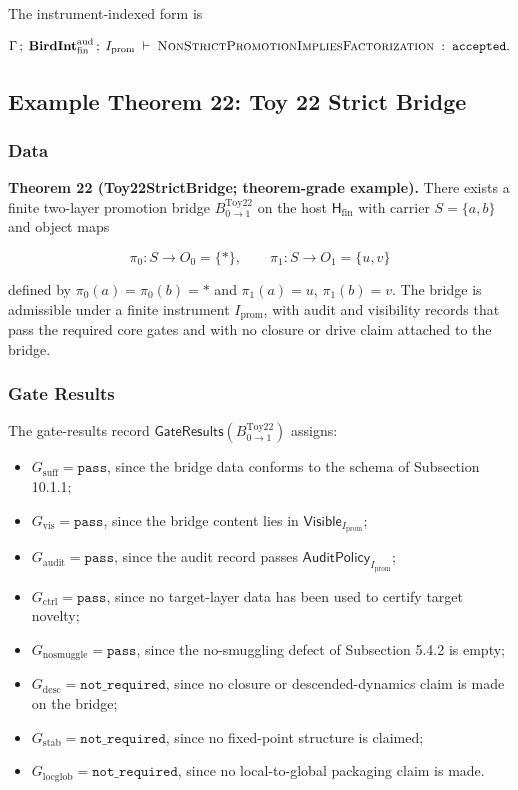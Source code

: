 \documentclass[11pt]{article}
\providecommand{\tightlist}{}
\theoremstyle{definition}
\begin{document}
The instrument-indexed form is

\[
\Gamma\,;\;\mathbf{BirdInt}^{\mathrm{aud}}_{\mathrm{fin}}\,;\;I_{\mathrm{prom}}\;\vdash\;\textsc{NonStrictPromotionImpliesFactorization}\;:\;\texttt{accepted}.
\]

\subsection{Example Theorem 22: Toy 22 Strict Bridge}

\subsubsection{Data}

\textbf{Theorem 22 (Toy22StrictBridge; theorem-grade example).} There exists a finite two-layer promotion bridge \(B_{0\to 1}^{\mathrm{Toy22}}\) on the host \(\mathsf H_{\mathrm{fin}}\) with carrier \(S=\{a,b\}\) and object maps

\[
\pi_0\colon S\to O_0=\{*\},\qquad \pi_1\colon S\to O_1=\{u,v\}
\]

defined by \(\pi_0(a)=\pi_0(b)=*\) and \(\pi_1(a)=u\), \(\pi_1(b)=v\). The bridge is admissible under a finite instrument \(I_{\mathrm{prom}}\), with audit and visibility records that pass the required core gates and with no closure or drive claim attached to the bridge.

\subsubsection{Gate Results}

The gate-results record \(\mathsf{GateResults}(B_{0\to 1}^{\mathrm{Toy22}})\) assigns:

\begin{itemize}
\tightlist
\item
  \(G_{\mathrm{suff}}=\texttt{pass}\), since the bridge data conforms to the schema of Subsection 10.1.1;
\item
  \(G_{\mathrm{vis}}=\texttt{pass}\), since the bridge content lies in \(\mathsf{Visible}_{I_{\mathrm{prom}}}\);
\item
  \(G_{\mathrm{audit}}=\texttt{pass}\), since the audit record passes \(\mathsf{AuditPolicy}_{I_{\mathrm{prom}}}\);
\item
  \(G_{\mathrm{ctrl}}=\texttt{pass}\), since no target-layer data has been used to certify target novelty;
\item
  \(G_{\mathrm{nosmuggle}}=\texttt{pass}\), since the no-smuggling defect of Subsection 5.4.2 is empty;
\item
  \(G_{\mathrm{desc}}=\texttt{not\_required}\), since no closure or descended-dynamics claim is made on the bridge;
\item
  \(G_{\mathrm{stab}}=\texttt{not\_required}\), since no fixed-point structure is claimed;
\item
  \(G_{\mathrm{locglob}}=\texttt{not\_required}\), since no local-to-global packaging claim is made.
\end{itemize}
\end{document}
